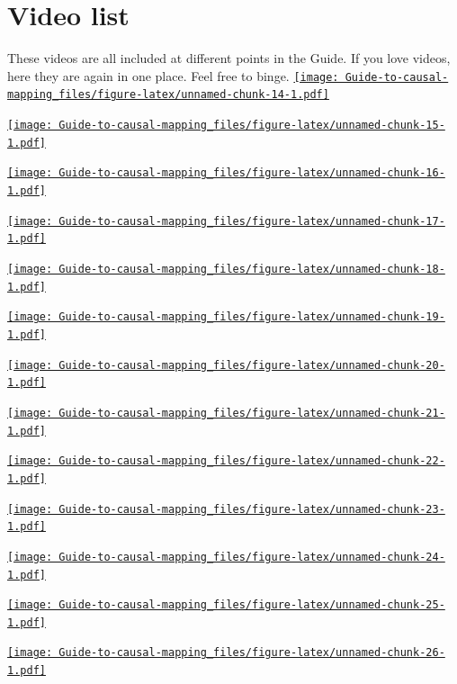 \documentclass[
]{book}
\begin{document}
\hypertarget{xvideo-list}{%
\chapter{Video list}\label{xvideo-list}}

These videos are all included at different points in the Guide. If you love videos, here they are again in one place. Feel free to binge.
\href{https://player.vimeo.com/video/689223728}{\texttt{[image: Guide-to-causal-mapping\_files/figure-latex/unnamed-chunk-14-1.pdf]}}

\href{https://player.vimeo.com/video/674369121}{\texttt{[image: Guide-to-causal-mapping\_files/figure-latex/unnamed-chunk-15-1.pdf]}}

\href{https://player.vimeo.com/video/641927229}{\texttt{[image: Guide-to-causal-mapping\_files/figure-latex/unnamed-chunk-16-1.pdf]}}

\href{https://player.vimeo.com/video/604099226}{\texttt{[image: Guide-to-causal-mapping\_files/figure-latex/unnamed-chunk-17-1.pdf]}}

\href{https://player.vimeo.com/video/588851236}{\texttt{[image: Guide-to-causal-mapping\_files/figure-latex/unnamed-chunk-18-1.pdf]}}

\href{https://player.vimeo.com/video/588881701}{\texttt{[image: Guide-to-causal-mapping\_files/figure-latex/unnamed-chunk-19-1.pdf]}}

\href{https://player.vimeo.com/video/674383670}{\texttt{[image: Guide-to-causal-mapping\_files/figure-latex/unnamed-chunk-20-1.pdf]}}

\href{https://player.vimeo.com/video/596519456}{\texttt{[image: Guide-to-causal-mapping\_files/figure-latex/unnamed-chunk-21-1.pdf]}}

\href{https://player.vimeo.com/video/618270513}{\texttt{[image: Guide-to-causal-mapping\_files/figure-latex/unnamed-chunk-22-1.pdf]}}

\href{https://player.vimeo.com/video/596594094}{\texttt{[image: Guide-to-causal-mapping\_files/figure-latex/unnamed-chunk-23-1.pdf]}}

\href{https://player.vimeo.com/video/596497752}{\texttt{[image: Guide-to-causal-mapping\_files/figure-latex/unnamed-chunk-24-1.pdf]}}

\href{https://player.vimeo.com/video/580212681}{\texttt{[image: Guide-to-causal-mapping\_files/figure-latex/unnamed-chunk-25-1.pdf]}}

\href{https://player.vimeo.com/video/636997200}{\texttt{[image: Guide-to-causal-mapping\_files/figure-latex/unnamed-chunk-26-1.pdf]}}
\end{document}
